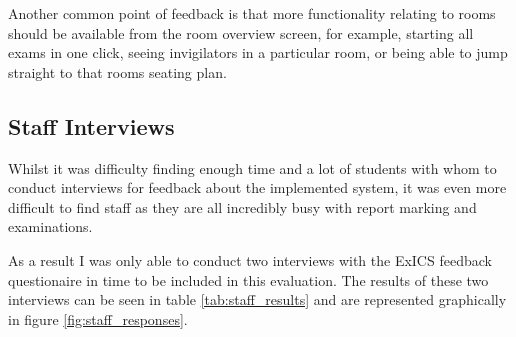 Another common point of feedback is that more functionality relating to rooms should be available from the room overview screen, for example, starting all exams in one click, seeing invigilators in a particular room, or being able to jump straight to that rooms seating plan.

\subsection{Staff Interviews}

Whilst it was difficulty finding enough time and a lot of students with whom to conduct interviews for feedback about the implemented system, it was even more difficult to find staff as they are all incredibly busy with report marking and examinations.

As a result I was only able to conduct two interviews with the ExICS feedback questionaire in time to be included in this evaluation.  The results of these two interviews can be seen in table \ref{tab:staff_results} and are represented graphically in figure \ref{fig:staff_responses}.

